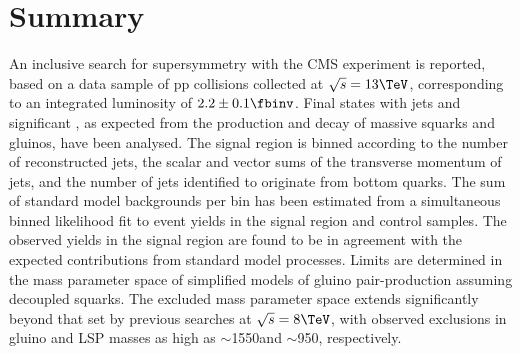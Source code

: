 \clearpage
\section{Summary}
\label{sec:summary}

An inclusive search for supersymmetry with the CMS experiment is
reported, based on a data sample of pp collisions collected at
$\sqrt{s} = 13\TeV$, corresponding to an integrated luminosity of $2.2
\pm 0.1 \fbinv$. Final states with jets and significant \ETmiss, as
expected from the production and decay of massive squarks and gluinos,
have been analysed. The signal region is binned according to the
number of reconstructed jets, the scalar and vector sums of the
transverse momentum of jets, and the number of jets identified to
originate from bottom quarks. The sum of standard model backgrounds
per bin has been estimated from a simultaneous binned likelihood fit
to event yields in the signal region and control samples. The observed
yields in the signal region are found to be in agreement with the
expected contributions from standard model processes. Limits are
determined in the mass parameter space of simplified models of gluino
pair-production assuming decoupled squarks. The excluded mass
parameter space extends significantly beyond that set by previous
searches at $\sqrt{s} = 8\TeV$, with observed exclusions in gluino and
LSP masses as high as $\sim$1550\gev and $\sim$950\gev, respectively.

